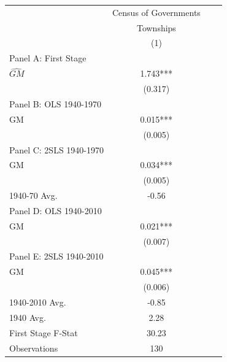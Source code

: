  \begin{tabular}{l*{3}{c}} \toprule
&\multicolumn{1}{c}{Census of Governments}\\\cmidrule(lr){2-2}
&\multicolumn{1}{c}{Townships}\\\cmidrule(lr){2-2}
&\multicolumn{1}{c}{(1)}\\
\cmidrule(lr){1-2}
\multicolumn{1}{l}{Panel A: First Stage}\\
\cmidrule(lr){1-2}
$\hat{GM}$      &    1.743***\\
                &  (0.317)   \\
\cmidrule(lr){1-2}
\multicolumn{1}{l}{Panel B: OLS 1940-1970}\\
\cmidrule(lr){1-2}
GM              &    0.015***\\
                &  (0.005)   \\
\cmidrule(lr){1-2}
\multicolumn{1}{l}{Panel C: 2SLS 1940-1970}\\
\cmidrule(lr){1-2}
GM              &    0.034***\\
                &  (0.005)   \\
\midrule
1940-70 Avg.    &    -0.56   \\
\cmidrule(lr){1-2}
\multicolumn{1}{l}{Panel D: OLS 1940-2010}\\
\cmidrule(lr){1-2}
GM              &    0.021***\\
                &  (0.007)   \\
\cmidrule(lr){1-2}
\multicolumn{1}{l}{Panel E: 2SLS 1940-2010}\\
\cmidrule(lr){1-2}
GM              &    0.045***\\
                &  (0.006)   \\
\midrule
1940-2010 Avg.  &    -0.85   \\
1940 Avg.       &     2.28   \\
First Stage F-Stat&    30.23   \\
Observations    &      130   \\
 \bottomrule \end{tabular}
